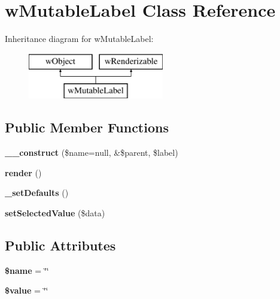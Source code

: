 \hypertarget{classwMutableLabel}{
\section{wMutableLabel Class Reference}
\label{classwMutableLabel}
}
Inheritance diagram for wMutableLabel:\begin{figure}[H]
\begin{center}
\leavevmode
\includegraphics[height=2.000000cm]{classwMutableLabel}
\end{center}
\end{figure}
\subsection*{Public Member Functions}
\begin{DoxyCompactItemize}
\item 
\hypertarget{classwMutableLabel_aeb1dc8a750435ed494315db68beb1efa}{
{\bfseries \_\-\_\-construct} (\$name=null, \&\$parent, \$label)}
\label{classwMutableLabel_aeb1dc8a750435ed494315db68beb1efa}

\item 
\hypertarget{classwMutableLabel_a31bc6b7bddf6c1c7f3d01bb4d2577904}{
{\bfseries render} ()}
\label{classwMutableLabel_a31bc6b7bddf6c1c7f3d01bb4d2577904}

\item 
\hypertarget{classwMutableLabel_aa8e0a3bdbce29bc38208b6a2a564759a}{
{\bfseries \_\-setDefaults} ()}
\label{classwMutableLabel_aa8e0a3bdbce29bc38208b6a2a564759a}

\item 
\hypertarget{classwMutableLabel_a01f3ee9991b1e0d31530dc52dbb6c87a}{
{\bfseries setSelectedValue} (\$data)}
\label{classwMutableLabel_a01f3ee9991b1e0d31530dc52dbb6c87a}

\end{DoxyCompactItemize}
\subsection*{Public Attributes}
\begin{DoxyCompactItemize}
\item 
\hypertarget{classwMutableLabel_af2fc02b9061095455dddb112ec640d8e}{
{\bfseries \$name} = \char`\"{}\char`\"{}}
\label{classwMutableLabel_af2fc02b9061095455dddb112ec640d8e}

\item 
\hypertarget{classwMutableLabel_aafbc3b73949bbe0b2e37748e7dab0c44}{
{\bfseries \$value} = \char`\"{}\char`\"{}}
\label{classwMutableLabel_aafbc3b73949bbe0b2e37748e7dab0c44}

\end{DoxyCompactItemize}


